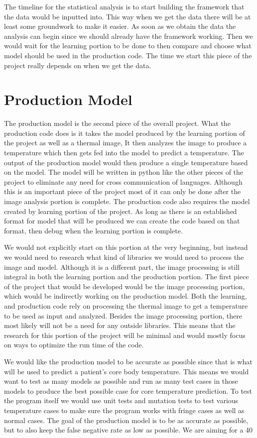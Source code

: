 \documentclass[onecolumn, draftclsnofoot,10pt, compsoc]{IEEEtran}
\begin{document}
The timeline for the statistical analysis is to start building the framework that the data would be inputted into. This way when we get the data there will be at least some groundwork to make it easier. As soon as we obtain the data the analysis can begin since we should already have the framework working. Then we would wait for the learning portion to be done to then compare and choose what model should be used in the production code. The time we start this piece of the project really depends on when we get the data.

\section{Production Model}
The production model is the second piece of the overall project. What the production code does is it takes the model produced by the learning portion of the project as well as a thermal image, It then analyzes the image to produce a temperature which then gets fed into the model to predict a temperature. The output of the production model would then produce a single temperature based on the model. The model will be written in python like the other pieces of the project to eliminate any need for cross communication of languages. Although this is an important piece of the project most of it can only be done after the image analysis portion is complete. The production code also requires the model created by learning portion of the project. As long as there is an established format for model that will be produced we can create the code based on that format, then debug when the learning portion is complete.

We would not explicitly start on this portion at the very beginning, but instead we would need to research what kind of libraries we would need to process the image and model. Although it is a different part, the image processing is still integral in both the learning portion and the production portion. The first piece of the project that would be developed would be the image processing portion, which would be indirectly working on the production model. Both the learning, and production code rely on processing the thermal image to get a temperature to be used as input and analyzed. Besides the image processing portion, there most likely will not be a need for any outside libraries. This means that the research for this portion of the project will be minimal and would mostly focus on ways to optimize the run time of the code.

We would like the production model to be accurate as possible since that is what will be used to predict a patient's core body temperature. This means we would want to test as many models as possible and run as many test cases in those models to produce the best possible case for core temperature prediction. To test the program itself we would use unit tests and mutation tests to test various temperature cases to make sure the program works with fringe cases as well as normal cases. The goal of the production model is to be as accurate as possible, but to also keep the false negative rate as low as possible. We are aiming for a 40%
\end{document}
